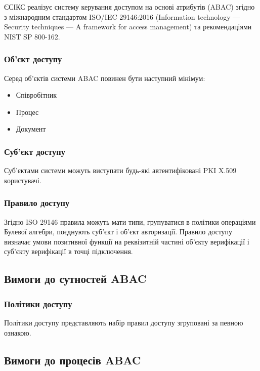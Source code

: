 \documentclass{article}
\begin{document}
ЄСІКС реалізує систему керування доступом на основі атрибутів (ABAC) згідно з міжнародним
стандартом ISO/IEC 29146:2016 (Information technology — Security techniques — A framework for
access management) та рекомендаціями NIST SP 800-162.

\subsubsection{Об'єкт доступу}

Серед об'єктів системи ABAC повинен бути наступний мінімум:

\begin{itemize}
\item Співробітник
\item Процес
\item Документ
\end{itemize}

\subsubsection{Суб'єкт доступу}

Суб'єктами системи можуть виступати будь-які автентифіковані PKI X.509 користувачі.

\subsubsection{Правило доступу}

Згідно ISO 29146 правила можуть мати типи, групуватися в політики операціями Булевої алгебри,
поєднують суб'єкт і об'єкт авторизації. Правило доступу визначає умови позитивної функції
на реквізитній частині об'єкту верифікації і суб'єкту верифікації в точці підключення.

\subsection{Вимоги до сутностей ABAC}

\subsubsection{Політики доступу}
Політики доступу представляють набір правил доступу згруповані за певною ознакою.

\subsection{Вимоги до процесів ABAC}
\end{document}
